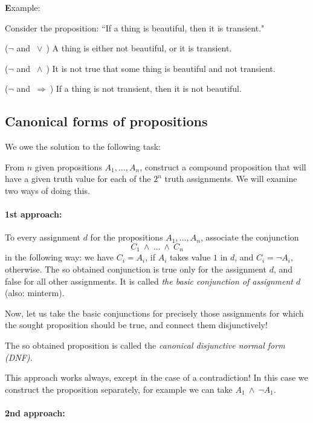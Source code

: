 \documentclass[11pt,paper=b5,footinclude,headinclude]{scrbook} %
\def\ali {{~\vee~}}
\def\inn {{~\wedge~}}
\def\sledi {{~\Rightarrow~}}
\theoremstyle{remark}
\theoremstyle{definition} %
\begin{document}
\medskip
{\textbf Example:}

Consider the proposition: ``If a thing is beautiful, then it is transient."

($\neg$ and $\ali$) A thing is either not beautiful, or it is transient.

($\neg$ and $\inn$) It is not true that some thing is beautiful and not transient.

($\neg$ and $\sledi$) If a thing is not transient, then it is not beautiful.



\subsection{Canonical forms of propositions}

We owe the solution to the following task:

From $n$ given propositions $A_1,\ldots, A_n$, construct a compound proposition that will have a
 given truth value for each of the  $2^n$ truth assignments.
We will examine two ways of doing this.

\bigskip

\paragraph{1st approach:}
To every assignment $d$ for the propositions $A_1,\ldots, A_n$, associate the conjunction
$$C_1\inn \ldots \inn C_n$$
in the following way:
we have $C_i = A_i$, if $A_i$ takes value $1$ in $d$, and
$C_i = \neg A_i$, otherwise.
The so obtained conjunction is true only for the assignment $d$, and false for all other assignments.
It is called {\em the basic conjunction of assignment $d$} (also: minterm).

Now, let us take the basic conjunctions for precisely those assignments for which the sought proposition should be true, and
connect them disjunctively!

The so obtained proposition is called the {\em canonical disjunctive normal form (DNF).}

This approach works always, except in the case of a contradiction!
In this case we construct the proposition separately, for example
we can take $A_1\inn \neg A_1$.

\paragraph{2nd approach:}
\end{document}
